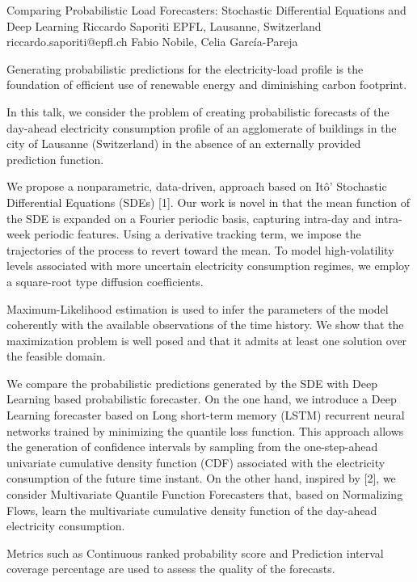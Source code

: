 \begin{talk}
  {Comparing Probabilistic Load Forecasters: Stochastic Differential Equations and Deep Learning}%
  {Riccardo Saporiti}%
  {EPFL, Lausanne, Switzerland}%
  {riccardo.saporiti@epfl.ch}%
  {Fabio Nobile, Celia Garc\'ia-Pareja}%
  
    

Generating probabilistic predictions for the electricity-load profile is the foundation of efficient use of renewable energy and diminishing carbon footprint.

In this talk, we consider the problem of creating probabilistic forecasts of the day-ahead electricity consumption profile of an agglomerate of buildings in the city of Lausanne (Switzerland) in the absence of an externally provided prediction function. 
 
We propose a nonparametric, data-driven, approach based on It\^o' Stochastic Differential Equations (SDEs) [1]. Our work is novel in that the mean function of the SDE is expanded on a Fourier periodic basis, capturing intra-day and intra-week periodic features. 
Using a derivative tracking term, we impose the trajectories of the process to revert toward the mean. To model high-volatility levels associated with more uncertain electricity consumption regimes, we employ a square-root type diffusion coefficients. 

Maximum-Likelihood estimation is used to infer the parameters of the model coherently with the available observations of the time history. We show that the maximization problem is well posed and that it admits at least one solution over the feasible domain. 

We compare the probabilistic predictions generated by the SDE with Deep Learning based probabilistic forecaster. 
On the one hand, we introduce a Deep Learning forecaster based on Long short-term memory (LSTM) recurrent neural networks trained by minimizing the quantile loss function. This approach allows the generation of confidence intervals by sampling from the one-step-ahead univariate cumulative density function (CDF) associated with the electricity consumption of the future time instant. 
On the other hand, inspired by [2], we consider Multivariate Quantile Function Forecasters that, based on Normalizing Flows, learn the multivariate cumulative density function of the day-ahead electricity consumption.

Metrics such as Continuous ranked probability score and Prediction interval coverage percentage are used to assess the quality of the forecasts. 


\end{talk}
